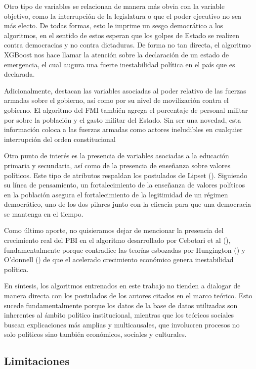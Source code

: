 \documentclass{article}
\begin{document}
Otro tipo de variables se relacionan de manera más obvia con la variable objetivo, como la interrupción de
la legislatura o que el poder ejecutivo no sea más electo. De todas formas, esto le imprime un sesgo
democrático a los algoritmos, en el sentido de estos esperan que los golpes de Estado se 
realizen contra democracias y no contra dictaduras. De forma no tan directa, el algoritmo XGBoost nos hace
llamar la atención sobre la declaración de un estado de emergencia, el cual augura una fuerte
inestabilidad política en el país que es declarada.

Adicionalmente, destacan las variables asociadas al poder relativo de las fuerzas armadas sobre el gobierno,
así como por su nivel de movilización contra el gobierno. El algoritmo del FMI también agrega el porcentaje
de personal militar por sobre la población y el gasto militar del Estado. Sin ser una novedad, esta 
información coloca a las fuerzas armadas como actores ineludibles en cualquier interrupción del orden 
constitucional

Otro punto de interés es la presencia de variables asociadas a la educación primaria y secundaria, así como
de la presencia de enseñanza sobre valores políticos. Este tipo de atributos respaldan los postulados de
Lipset (\citeyear{lipset1959some}). Siguiendo su línea de pensamiento, un fortalecimiento de la enseñanza
de valores políticos en la población asegura el fortalecimiento de la legitimidad de un régimen democrático,
uno de los dos pilares junto con la eficacia para que una democracia se mantenga en el tiempo.

Como último aporte, no quisieramos dejar de mencionar la presencia del crecimiento real del PBI en el
algoritmo desarrollado por Cebotari et al (\citeyear{Ceb24}), fundamentalmente porque contradice las teorías
esbozadas por Hungington (\citeyear{huntington68political}) y O'donnell (\citeyear{o1972modernizacion}) de
que el acelerado crecimiento económico genera inestabilidad política.

En síntesis, los algoritmos entrenados en este trabajo no tienden a dialogar de manera directa con los
postulados de los autores citados en el marco teórico. Esto sucede fundamentalmente porque los datos de
la base de datos utilizadas son inherentes al ámbito político institucional, mientras que los teóricos
sociales buscan explicaciones más amplias y multicausales, que involucren procesos no solo políticos sino
también económicos, sociales y culturales. 

\subsection{Limitaciones}
\end{document}
